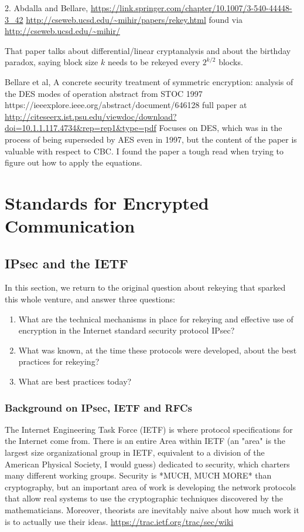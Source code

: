 \documentclass[%
 aip,
 jmp,%
 amsmath,amssymb,
 reprint,%
]{revtex4-1}
\begin{document}
2. Abdalla and Bellare,
\url{https://link.springer.com/chapter/10.1007/3-540-44448-3_42}
\url{http://cseweb.ucsd.edu/~mihir/papers/rekey.html}
found via
\url{http://cseweb.ucsd.edu/~mihir/}

That paper talks about differential/linear cryptanalysis and about the
birthday paradox, saying block size $k$ needs to be rekeyed every
$2^{k/2}$ blocks.

Bellare et al, A concrete security treatment of symmetric encryption:
analysis of the DES modes of operation
abstract from STOC 1997
https://ieeexplore.ieee.org/abstract/document/646128
full paper at
\url{http://citeseerx.ist.psu.edu/viewdoc/download?doi=10.1.1.117.4734&rep=rep1&type=pdf}
Focuses on DES, which was in the process of being superseded by AES
even in 1997, but the content of the paper is valuable with respect to
CBC.  I found the paper a tough read when trying to figure out how to
apply the equations.

\section{Standards for Encrypted Communication}

\subsection{IPsec and the IETF}
\label{sec:ipsec}

In this section, we return to the original question about rekeying
that sparked this whole venture, and answer three questions:

\begin{enumerate}
\item What are the technical mechanisms in place for rekeying and
   effective use of encryption in the Internet standard security
   protocol IPsec?
\item What was known, at the time these protocols were developed, about
   the best practices for rekeying?
\item What are best practices today?
\end{enumerate}

\subsubsection{Background on IPsec, IETF and RFCs}

The Internet Engineering Task Force (IETF) is where protocol
specifications for the Internet come from.  There is an entire Area
within IETF (an "area" is the largest size organizational group in
IETF, equivalent to a division of the American Physical Society, I
would guess) dedicated to security, which charters many different
working groups.  Security is *MUCH, MUCH MORE* than cryptography, but
an important area of work is developing the network protocols that
allow real systems to use the cryptographic techniques discovered by
the mathematicians.  Moreover, theorists are inevitably naive about
how much work it is to actually use their ideas.
\url{https://trac.ietf.org/trac/sec/wiki}
\end{document}
